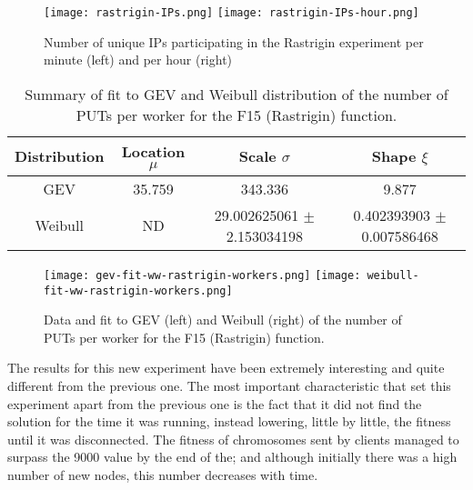 \documentclass[journal,onecolumn]{IEEEtran}
\begin{document}
%
%
\begin{figure}[!htb]
\centering
\texttt{[image: rastrigin-IPs.png]}
\texttt{[image: rastrigin-IPs-hour.png]}
\caption{Number of unique IPs participating in the Rastrigin
  experiment per minute (left) and per hour (right)} 
\label{fig:ips:rastrigin}
\end{figure}
%
\begin{table*}
\caption{Summary of fit to GEV and Weibull distribution of
  the number of PUTs per worker for the F15 (Rastrigin) function. \label{tab:puts:ww:f15}}
\begin{center}
\begin{tabular}{cccc}
\hline
Distribution & Location $\mu$ & Scale $\sigma$ & Shape $\xi$ \\
\hline
GEV & 35.759  &  343.336   & 9.877 \\
Weibull & ND & 29.002625061 $\pm$ 2.153034198  & 0.402393903 $\pm$ 0.007586468 \\
\hline
\end{tabular}
\end{center}
\end{table*}
%
\begin{figure}[!htb]
\centering
\texttt{[image: gev-fit-ww-rastrigin-workers.png]}
\texttt{[image: weibull-fit-ww-rastrigin-workers.png]}
\caption{Data and fit to GEV (left) and Weibull (right) of the number
  of PUTs per worker for the F15 (Rastrigin) function.}  
\label{fig:fit:rastrigin}
\end{figure}
%

The results for this new experiment have been extremely interesting
and quite different from the previous one. The most important
characteristic that set this experiment apart from the previous one is
the fact that it did not find the solution for the time it was
running, instead lowering, little by little, the fitness until it was
disconnected. The fitness of chromosomes sent by clients managed to
surpass the 9000 value by the end of the; and although initially there
was a high number of new nodes, this number decreases with time.
\end{document}
